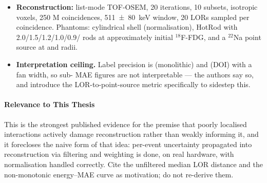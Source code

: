 \begin{itemize}
        $\sigma_{3D} = \sqrt{\sigma^2_{\mathrm{seg}} + \sigma^2_{\mathrm{mono}} +
        \sigma^2_{\mathrm{doi}}}$, and LOR weights as
        $w_{\mathrm{LOR}} = 1 / (\sigma_{3D,I_1} \cdot \sigma_{3D,I_2})^p$.
    \item \textbf{Reconstruction:} list-mode TOF-OSEM, 20 iterations, 10 subsets,
         isotropic voxels, 250 M coincidences,
        \qty[separate-uncertainty=true]{511 \pm 80}{\kilo\electronvolt} window,
        20 LORs sampled per coincidence. Phantoms: cylindrical shell (normalisation),
        HotRod with 2.0/1.5/1.2/1.0/0.9/ rods at approximately  initial
        $^{18}$F-FDG, and a  $^{22}$Na point source at  and  radii.
    \item \textbf{Interpretation ceiling.} Label precision is  (monolithic) and
         (DOI) with a  fan width, so sub- MAE figures are not
        interpretable --- the authors say so, and introduce the LOR-to-point-source metric
        specifically to sidestep this.
\end{itemize}

\paragraph{Relevance to This Thesis}
This is the strongest published evidence for the premise that poorly localised
interactions actively damage reconstruction rather than weakly informing it, and it
forecloses the naive form of that idea: per-event uncertainty propagated into
reconstruction via filtering and weighting is done, on real hardware, with normalisation
handled correctly. Cite the  unfiltered median LOR distance and the non-monotonic
energy--MAE curve as motivation; do not re-derive them.

